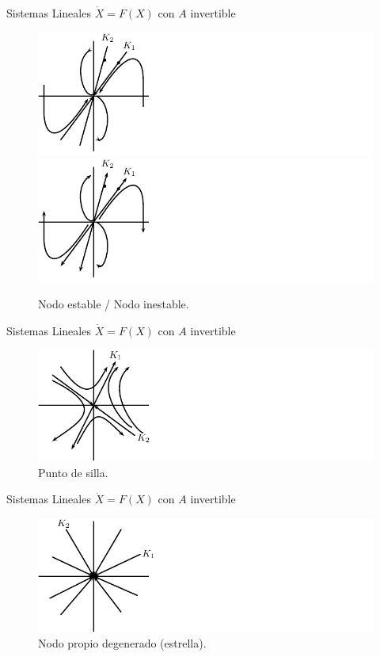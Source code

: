 \documentclass{beamer}
\begin{document}
\begin{frame}{Sistemas Lineales $\dot{X} = F(X)$ con $A$ invertible}
\begin{figure}[!ht] \centering
    \includegraphics[scale=1.0]{../figures/nodoestable.pdf} \hspace{0.4cm}
    \includegraphics[scale=1.0]{../figures/nodoinestable.pdf}
\caption{Nodo estable / Nodo inestable.}
\end{figure}
\end{frame}

\begin{frame}{Sistemas Lineales $\dot{X} = F(X)$ con $A$ invertible}
\begin{figure}[!ht] \centering
    \includegraphics[scale=1.0]{../figures/puntodesilla.pdf}
\caption{Punto de silla.}
\end{figure}
\end{frame}

\begin{frame}{Sistemas Lineales $\dot{X} = F(X)$ con $A$ invertible}
\begin{figure}[!ht] \centering
    \includegraphics[scale=1.0]{../figures/nodopropio.pdf}
\caption{Nodo propio degenerado (estrella).}
\end{figure}
\end{frame}
\end{document}
